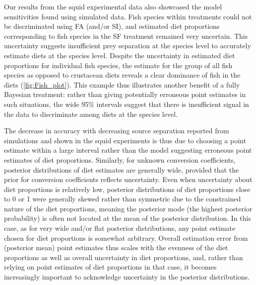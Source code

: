 \documentclass{article}%
\begin{document}
\begin{spacing}{1.9}
\begin{flushleft}
Our results from the squid experimental data also showcased the model
sensitivities found using simulated data. Fish species within treatments could
not be discriminated using FA (and/or SI), and estimated diet
proportions corresponding to fish species in the SF treatment remained
very uncertain. This uncertainty suggests insufficient prey
separation at the species level to accurately estimate diets at the
species level. Despite the uncertainty in estimated diet proportions for
individual fish species, the estimate for the group of all
fish species as opposed to crustacean diets reveals a clear dominance of
fish in the diets (\autoref{fig:Fish_plot}). This example thus illustrates another
benefit of a fully Bayesian treatment: rather than giving
potentially erroneous point estimates in such situations, the wide
95\% intervals suggest that there is insufficient signal in the
data to discriminate among diets at the species level. 

The decrease in accuracy with decreasing source separation reported from simulations and shown in the
squid experiments is thus due to choosing a point estimate within a
large interval rather
than the model suggesting erroneous point estimates of diet proportions. Similarly, for unknown conversion coefficients, posterior
distributions of diet estimates are generally wide, provided that the
prior for conversion coefficients reflects uncertainty. Even when
uncertainty about diet proportions is relatively low, posterior distributions of diet proportions close to 0 or
1 were generally skewed rather than symmetric due to the constrained nature of the diet
proportions, meaning the posterior
mode (the highest posterior probability) is often not located at the
mean of the posterior distribution. In this case, as for very wide and/or flat
posterior distributions, any point estimate
chosen for diet proportions is somewhat arbitrary. Overall estimation error from (posterior mean) point
estimates thus scales with the evenness of the diet proportions as
well as overall uncertainty in diet proportions, and,
rather than relying on point estimates of diet proportions in that case,
it becomes increasingly important to acknowledge uncertainty in the
posterior distributions.


\end{flushleft}
\end{spacing}
\end{document}
